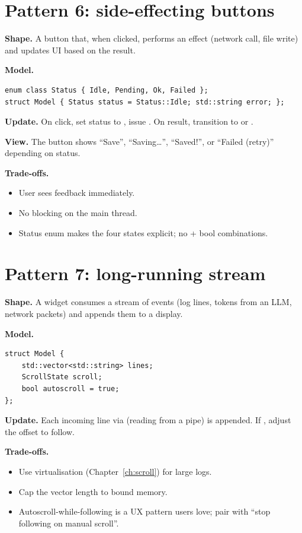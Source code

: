 \section{Pattern 6: side-effecting buttons}

\textbf{Shape.} A button that, when clicked, performs an effect
(network call, file write) and updates UI based on the result.

\textbf{Model.}

\begin{lstlisting}
enum class Status { Idle, Pending, Ok, Failed };
struct Model { Status status = Status::Idle; std::string error; };
\end{lstlisting}

\textbf{Update.} On click, set status to , issue
. On result, transition to  or
.

\textbf{View.} The button shows ``Save'', ``Saving\ldots'',
``Saved!'', or ``Failed (retry)'' depending on status.

\textbf{Trade-offs.}

\begin{itemize}[leftmargin=*]
  \item User sees feedback immediately.
  \item No blocking on the main thread.
  \item Status enum makes the four states explicit; no
     +  bool combinations.
\end{itemize}

\section{Pattern 7: long-running stream}

\textbf{Shape.} A widget consumes a stream of events (log lines,
tokens from an LLM, network packets) and appends them to a
display.

\textbf{Model.}

\begin{lstlisting}
struct Model {
    std::vector<std::string> lines;
    ScrollState scroll;
    bool autoscroll = true;
};
\end{lstlisting}

\textbf{Update.} Each incoming line via 
(reading from a pipe) is appended. If , adjust
the offset to follow.

\textbf{Trade-offs.}

\begin{itemize}[leftmargin=*]
  \item Use virtualisation (Chapter~\ref{ch:scroll}) for
    large logs.
  \item Cap the vector length to bound memory.
  \item Autoscroll-while-following is a UX pattern users love;
    pair with ``stop following on manual scroll''.
\end{itemize}

